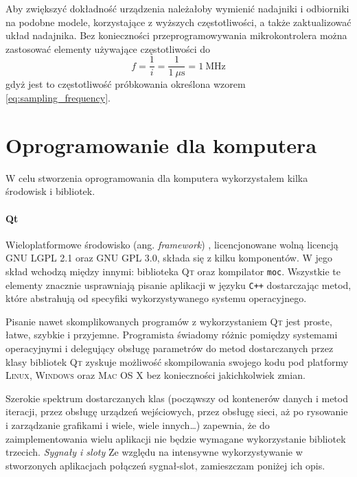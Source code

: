 Aby zwiększyć dokładność urządzenia należałoby wymienić nadajniki i odbiorniki na podobne modele, korzystające z wyższych częstotliwości, a także zaktualizować układ nadajnika. Bez konieczności przeprogramowywania mikrokontrolera można zastosować elementy używające częstotliwości do
\begin{equation}
 f = \frac{1}{i} = \frac{1}{1~\mu\textrm{s}} = 1~\textrm{MHz}
\end{equation}
gdyż jest to częstotliwość próbkowania określona wzorem \ref{eq:sampling_frequency}.

\section{Oprogramowanie dla komputera}
W celu stworzenia oprogramowania dla komputera wykorzystałem kilka środowisk i bibliotek.

\paragraph{Qt}
Wieloplatformowe środowisko (ang. \textsl{framework}) , licencjonowane wolną licencją \textsc{GNU LGPL 2.1} oraz \textsc{GNU GPL 3.0}, składa się z kilku komponentów. W jego skład wchodzą między innymi: biblioteka \textsc{Qt} oraz kompilator \verb|moc|. Wszystkie te elementy znacznie usprawniają pisanie aplikacji w języku \verb|C++| dostarczając metod, które abstrahują od specyfiki wykorzystywanego systemu operacyjnego.

Pisanie nawet skomplikowanych programów z wykorzystaniem \textsc{Qt} jest proste, łatwe, szybkie i przyjemne. Programista świadomy różnic pomiędzy systemami operacyjnymi i delegujący obsługę parametrów do metod dostarczanych przez klasy bibliotek \textsc{Qt} zyskuje możliwość skompilowania swojego kodu pod platformy \textsc{Linux}, \textsc{Windows} oraz \textsc{Mac OS X} bez konieczności jakichkolwiek zmian.

Szerokie spektrum dostarczanych klas (począwszy od kontenerów danych i metod iteracji, przez obsługę urządzeń wejściowych, przez obsługę sieci, aż po rysowanie i zarządzanie grafikami i wiele, wiele innych\ldots) zapewnia, że do zaimplementowania wielu aplikacji nie będzie wymagane wykorzystanie bibliotek trzecich.
\newline
\newline
\textsl{Sygnały i sloty}
Ze względu na intensywne wykorzystywanie w stworzonych aplikacjach połączeń sygnał-slot, zamieszczam poniżej ich opis.

